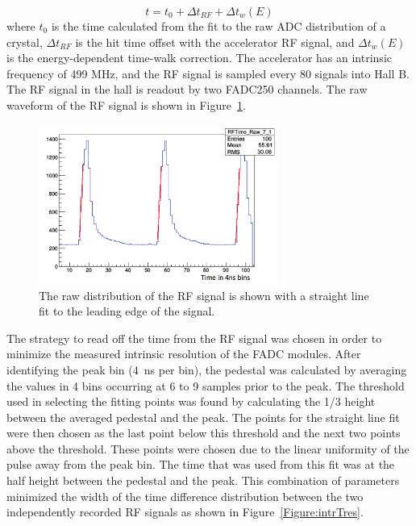 \begin{equation}
	\label{eq:toff}
	t = t_0 +\Delta t_{RF} + \Delta t_w (E)
\end{equation}
where $t_0$ is the time calculated from the fit to the raw ADC distribution of a crystal, $\Delta t_{RF}$ is the hit time offset with the accelerator RF signal, and $\Delta t_w(E)$ is the energy-dependent time-walk correction. The accelerator has an intrinsic frequency of 499 MHz, and the RF signal is sampled every 80 signals into Hall B. The RF signal in the hall is readout by two FADC250 channels. The raw waveform of the RF signal is shown in Figure~\ref{Figure:rfFits}. 

\begin{figure}[htb]
  \centering
      \includegraphics[width=0.7\textwidth]{pics/performance/rfFits.png}
  \caption[Fitted, raw waveform of the RF signal in HPS]{The raw distribution of the RF signal is shown with a straight line fit to the leading edge of the signal.}
  \label{Figure:rfFits}
\end{figure}

The strategy to read off the time from the RF signal was chosen in order to minimize the measured intrinsic resolution of the FADC modules. After identifying the peak bin (4~ns per bin), the pedestal was calculated by averaging the values in 4 bins occurring at 6 to 9 samples prior to the peak. The threshold used in selecting the fitting points was found by calculating the 1/3 height between the averaged pedestal and the peak. The points for the straight line fit were then chosen as the last point below this threshold and the next two points above the threshold. These points were chosen due to the linear uniformity of the pulse away from the
peak bin. The time that was used from this fit was at the half height between the pedestal and the peak. This combination of parameters minimized the width of the time difference distribution between the two independently recorded RF signals as shown in Figure~\ref{Figure:intrTres}. 

